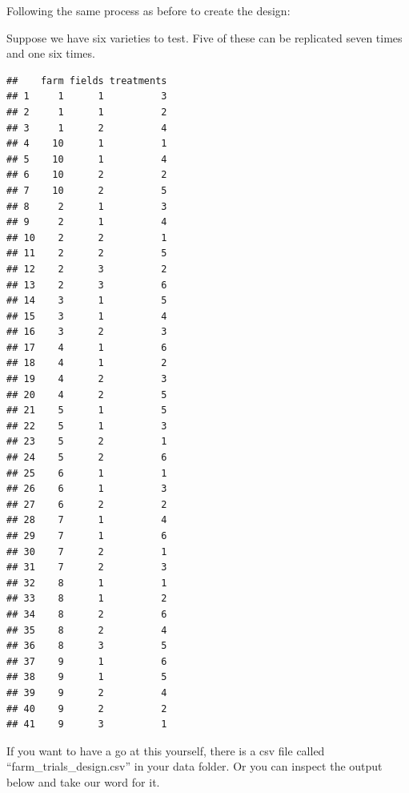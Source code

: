 \documentclass[
]{book}
\makeatletter
\newenvironment{Shaded}{\begin{snugshade}}{\end{snugshade}}
\newcommand{\AttributeTok}[1]{\textcolor[rgb]{0.77,0.63,0.00}{#1}}
\newcommand{\DecValTok}[1]{\textcolor[rgb]{0.00,0.00,0.81}{#1}}
\newcommand{\FunctionTok}[1]{\textcolor[rgb]{0.00,0.00,0.00}{#1}}
\newcommand{\NormalTok}[1]{#1}
\newcommand{\OtherTok}[1]{\textcolor[rgb]{0.56,0.35,0.01}{#1}}
\newcommand{\SpecialCharTok}[1]{\textcolor[rgb]{0.00,0.00,0.00}{#1}}
\newenvironment{kframe}{%
\medskip{}
\setlength{\fboxsep}{.8em}
 \def\at@end@of@kframe{}%
 \ifinner\ifhmode%
  \def\at@end@of@kframe{\end{minipage}}%
  \begin{minipage}{\columnwidth}%
 \fi\fi%
 \def\FrameCommand##1{\hskip\@totalleftmargin \hskip-\fboxsep
 \colorbox{shadecolor}{##1}\hskip-\fboxsep
     \hskip-\linewidth \hskip-\@totalleftmargin \hskip\columnwidth}%
 \MakeFramed {\advance\hsize-\width
   \@totalleftmargin\z@ \linewidth\hsize
   \@setminipage}}%
 {\par\unskip\endMakeFramed%
 \at@end@of@kframe}
\newenvironment{rmdblock}[1]
  {
  \begin{itemize}
  \renewcommand{\labelitemi}{
    \raisebox{-.7\height}[0pt][0pt]{
      {\setkeys{Gin}{width=3em,keepaspectratio}\texttt{[image: images/\#1]}}
    }
  }
  \setlength{\fboxsep}{1em}
  \begin{kframe}
  \item
  }
  {
  \end{kframe}
  \end{itemize}
  }
\newenvironment{rmdnote}
  {\begin{rmdblock}{note}}
  {\end{rmdblock}}
\makeatother
\begin{document}
Following the same process as before to create the design:

Suppose we have six varieties to test. Five of these can be replicated seven times and one six times.

\begin{Shaded}
\end{Shaded}

\begin{verbatim}
##    farm fields treatments
## 1     1      1          3
## 2     1      1          2
## 3     1      2          4
## 4    10      1          1
## 5    10      1          4
## 6    10      2          2
## 7    10      2          5
## 8     2      1          3
## 9     2      1          4
## 10    2      2          1
## 11    2      2          5
## 12    2      3          2
## 13    2      3          6
## 14    3      1          5
## 15    3      1          4
## 16    3      2          3
## 17    4      1          6
## 18    4      1          2
## 19    4      2          3
## 20    4      2          5
## 21    5      1          5
## 22    5      1          3
## 23    5      2          1
## 24    5      2          6
## 25    6      1          1
## 26    6      1          3
## 27    6      2          2
## 28    7      1          4
## 29    7      1          6
## 30    7      2          1
## 31    7      2          3
## 32    8      1          1
## 33    8      1          2
## 34    8      2          6
## 35    8      2          4
## 36    8      3          5
## 37    9      1          6
## 38    9      1          5
## 39    9      2          4
## 40    9      2          2
## 41    9      3          1
\end{verbatim}

\begin{rmdnote}
If you want to have a go at this yourself, there is a csv file called ``farm\_trials\_design.csv'' in your data folder. Or you can inspect the output below and take our word for it.
\end{rmdnote}
\end{document}
